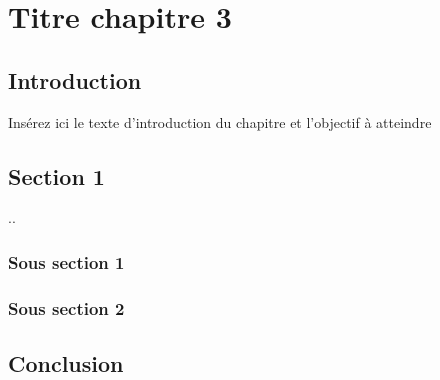 \chapter{Titre chapitre 3}

\section{Introduction}
Insérez ici le texte d’introduction du chapitre et l’objectif à atteindre

\section{Section 1}
..
\subsection{Sous section 1}
\subsection{Sous section 2}
	\section{Conclusion}
	